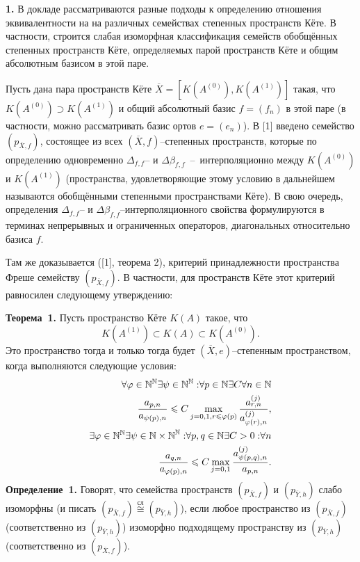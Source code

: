 

\vzmscaption
{\bf 1. }В докладе рассматриваются разные подходы к определению отношения эквивалентности на на различных семействах степенных пространств Кёте. В частности, строится слабая изоморфная классификация семейств обобщённых степенных пространств Кёте,
определяемых парой пространств Кёте и общим абсолютным базисом в этой паре.

Пусть дана пара пространств Кёте $\overline{X}=[K(A^{(0)}),K(A^{(1)})]$ такая, что
$K(A^{(0)})\supset K(A^{(1)})$ и общий абсолютный базис $f=(f_n)$ в этой паре (в частности, можно
рассматривать базис ортов $e=(e_n)$). В [1] введено семейство $(p_{\overline{X},f})$, состоящее из
всех $(\overline{X},f)$--степенных пространств, которые по определению одновременно $\Delta_{f,f}$-- и
$\Delta\beta _{f,f}$~--~интерполяционно между $K(A^{(0)})$ и $K(A^{(1)})$ (пространства, удовлетворяющие
этому условию в дальнейшем называются обобщёнными степенными пространствами Кёте). В свою очередь,
определения $\Delta_{f,f}$-- и $\Delta\beta _{f,f}$--интерполяционного свойства формулируются в
терминах непрерывных и ограниченных операторов, диагональных относительно базиса $f$.

Там же доказывается ([1], теорема 2), критерий принадлежности пространства Фреше семейству
$(p_{\overline{X},f})$. В частности, для пространств Кёте этот
критерий равносилен следующему утверждению:

\noindent\textbf{Теорема~1.}
Пусть пространство Кёте $K(A)$ такое, что
$$K(A^{(1)})\subset K(A)\subset K(A^{(0)}).$$ Это пространство
тогда и только тогда будет $(\overline{X},e)$--степенным пространством, когда
выполняются следующие условия:
\begin{eqnarray*}
\forall{\varphi \in {\Bbb N}^{\Bbb N}}\exists{\psi \in {\Bbb N}^{\Bbb N}:}
\forall{p\in {\Bbb N}}\exists{C}\forall{n \in {\Bbb N}}\\
\dfrac{a_{p,n}}{a_{\psi(p),n}}\leqslant C
\max\limits_{j=0,1,r\leqslant \varphi(p)}
\dfrac{a^{(j)}_{r,n}}{a^{(j)}_{\varphi (r),n}}, \\
\exists{\varphi \in {\Bbb N}^{\Bbb N}}\exists{\psi \in {\Bbb N\times {\Bbb N}}^{\Bbb N}:}
\forall{p,q\in {\Bbb N}}\exists{C>0:}\forall{n}\\
\dfrac{a_{q,n}}{a_{\varphi (p),n}}\leqslant C
\max\limits_{j=0,1}
\dfrac{a^{(j)}_{\psi(p,q),n}}{a_{p,n}}.
\end{eqnarray*}
\noindent\textbf{Определение~1.}
Говорят, что семейства про\-странств $(p_{\overline{X},f})$ и $(p_{\overline{Y},h})$ слабо изоморфны
(и писать
$(p_{\overline{X},f})\stackrel{\text{сл}}{\cong}(p_{\overline{Y},h})$), если любое пространство из
$(p_{\overline{X},f})$ (соответственно из $(p_{\overline{Y},h})$) изоморфно подходящему пространству из
$(p_{\overline{Y},h})$ (соответственно из $(p_{\overline{X},f})$).

